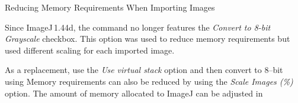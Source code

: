 \noindent {\small }
\begin{infobox}
\caption{\label{infobox:ImportImgSeq}Reducing Memory Requirements When Importing
Images}


\noindent Since ImageJ\,1.44d, the 
command no longer features the \emph{Convert to 8-bit Grayscale} checkbox.
This option was used to reduce memory requirements but used different
scaling for each imported image.\medskip{}


\noindent As a replacement, use the \emph{Use virtual stack} option
and then convert to 8--bit using 
Memory requirements can also be reduced by using the \emph{Scale Images
(\%) }option. The amount of memory allocated to ImageJ
can be adjusted in 
\end{infobox}
{\small \par}


\subsubsection{\protect{}\label{sub:Import>Raw}}

